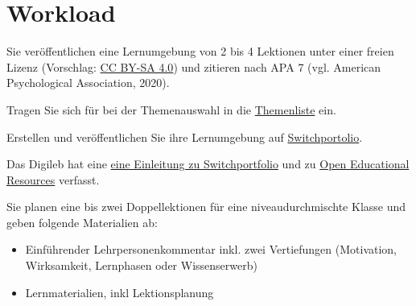 \documentclass[
  10pt,
  a4paper,
  DIV=11,
  oneside]{scrartcl}
\providecommand{\tightlist}{%
  \setlength{\itemsep}{0pt}\setlength{\parskip}{0pt}}\usepackage{longtable,booktabs,array}
\begin{document}
\section{Workload}\label{workload}

Sie veröffentlichen eine Lernumgebung von 2 bis 4 Lektionen unter einer
freien Lizenz (Vorschlag:
\href{https://creativecommons.org/licenses/by-sa/4.0/}{CC BY-SA 4.0})
und zitieren nach APA 7 (vgl. American Psychological Association, 2020).

Tragen Sie sich für bei der Themenauswahl in die
\href{https://phbern365.sharepoint.com/:x:/r/sites/IS1_Z_FachteamMathematik/_layouts/15/Doc2.aspx?action=edit&sourcedoc=\%7B6d7b7b77-e701-495c-a734-95aa8c684020\%7D&wdOrigin=TEAMS-MAGLEV.teamsSdk_ns.rwc&wdExp=TEAMS-TREATMENT&wdhostclicktime=1725374697781&web=1&CID=2f77316a-b428-4c26-ed85-c19100b5eb17}{Themenliste}
ein.

Erstellen und veröffentlichen Sie ihre Lernumgebung auf
\href{https://portfolio.switch.ch/}{Switchportolio}.

\begin{tcolorbox}[enhanced jigsaw, opacitybacktitle=0.6, titlerule=0mm, left=2mm, colbacktitle=quarto-callout-tip-color!10!white, breakable, opacityback=0, bottomtitle=1mm, arc=.35mm, colframe=quarto-callout-tip-color-frame, title=\textcolor{quarto-callout-tip-color}{\faLightbulb}\hspace{0.5em}{Digileb Knowledge Base}, toptitle=1mm, rightrule=.15mm, colback=white, bottomrule=.15mm, toprule=.15mm, leftrule=.75mm, coltitle=black]

Das Digileb hat eine
\href{https://digileb.phbern.ch/medien-gestalten-und-nutzen/medien-gestalten/switchportfolio-gestalten/}{eine
Einleitung zu Switchportfolio} und zu
\href{https://digileb.phbern.ch/didaktisches-design/kollaboratives-lernen-und-arbeiten/oer-herstellen/}{Open
Educational Resources} verfasst.

\end{tcolorbox}

Sie planen eine bis zwei Doppellektionen für eine niveaudurchmischte
Klasse und geben folgende Materialien ab:

\begin{itemize}
\tightlist
\item
  Einführender Lehrpersonenkommentar inkl. zwei Vertiefungen
  (Motivation, Wirksamkeit, Lernphasen oder Wissenserwerb)
\item
  Lernmaterialien, inkl Lektionsplanung
\end{itemize}
\end{document}
